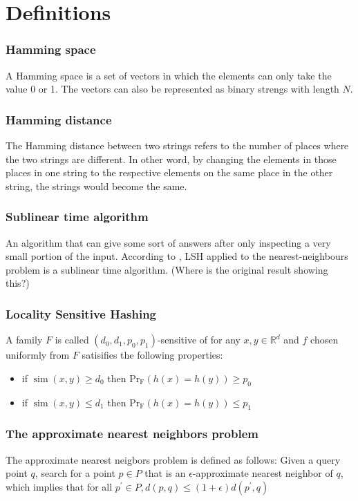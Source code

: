 \chapter{Definitions}\label{chap:definitions}
\subsection{Hamming space}
A Hamming space is a set of vectors in which the elements can only take the value 0 or 1. The vectors can also be represented as binary strengs with length $N$. 

\subsection{Hamming distance}
The Hamming distance between two strings refers to the number of places where the two strings are different. In other word, by changing the elements in those places in one string  to the respective elements on the same place in the other string, the strings would become the same.

\subsection{Sublinear time algorithm}
An algorithm that can give some sort of answers after only inspecting a very small portion of the input. According to \cite{KulisGrauman12}, LSH applied to the nearest-neighbours problem is a sublinear time algorithm. (Where is the original result showing this?)

\subsection{Locality Sensitive Hashing}
A family $F$ is called $(d_0, d_1, p_0, p_1)$-sensitive of for any $x, y \in \mathbb{R}^d$ and $f$ chosen uniformly from $F$ satisifies the following properties:
\begin{itemize}
    \item if $\operatorname{sim}(x, y) \geq d_0$ then $\operatorname{Pr_F}(h(x)=h(y)) \geq p_0$
    \item if $\operatorname{sim}(x, y) \leq d_1$ then $\operatorname{Pr_F}(h(x)=h(y)) \leq p_1$
    
\end{itemize}

\subsection{The approximate nearest neighbors problem}
The approximate nearest neigbors problem is defined as follows: Given a query point $q$, search for a point $p \in P$ that is an $\epsilon$-approximate nearest neighbor of $q$, which implies that for all $p^{'} \in P, d(p,q) \leq (1 + \epsilon)d(p^{'},q)$

